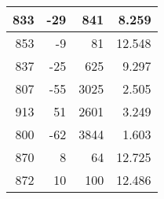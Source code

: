 \begin{longtable}{|r|r|r|r|}
	833                                                                                             & -29                                               & 841                                                  & 8.259                                                                                          \\ \hline
	853                                                                                             & -9                                                & 81                                                   & 12.548                                                                                         \\ \hline
	837                                                                                             & -25                                               & 625                                                  & 9.297                                                                                          \\ \hline
	807                                                                                             & -55                                               & 3025                                                 & 2.505                                                                                          \\ \hline
	913                                                                                             & 51                                                & 2601                                                 & 3.249                                                                                          \\ \hline
	800                                                                                             & -62                                               & 3844                                                 & 1.603                                                                                          \\ \hline
	870                                                                                             & 8                                                 & 64                                                   & 12.725                                                                                         \\ \hline
	872                                                                                             & 10                                                & 100                                                  & 12.486                                                                                         \\ \hline

\end{longtable}
